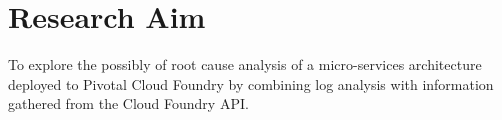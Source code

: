 \chapter{Research Aim}
To explore the possibly of root cause analysis of a micro-services architecture deployed to Pivotal Cloud Foundry by combining log analysis with information gathered from the Cloud Foundry API.